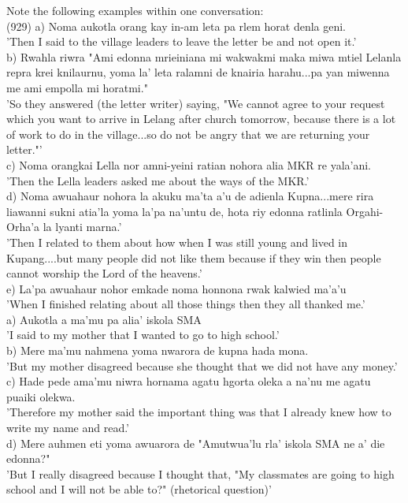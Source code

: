 \documentclass[10pt]{article}
\begin{document}
Note the following examples within one conversation:\\
(929) a) Noma aukotla orang kay in-am leta pa rlem horat denla geni.\\
'Then I said to the village leaders to leave the letter be and not open it.'\\
b) Rwahla riwra "Ami edonna mrieiniana mi wakwakmi maka miwa mtiel Lelanla repra krei knilaurnu, yoma la' leta ralamni de knairia harahu...pa yan miwenna me ami empolla mi horatmi."\\
'So they answered (the letter writer) saying, "We cannot agree to your request which you want to arrive in Lelang after church tomorrow, because there is a lot of work to do in the village...so do not be angry that we are returning your letter."'\\
c) Noma orangkai Lella nor amni-yeini ratian nohora alia MKR re yala'ani.\\
'Then the Lella leaders asked me about the ways of the MKR.'\\
d) Noma awuahaur nohora la akuku ma'ta a'u de adienla Kupna...mere rira liawanni sukni atia'la yoma la'pa na'untu de, hota riy edonna ratlinla Orgahi-Orha'a la lyanti marna.'\\
'Then I related to them about how when I was still young and lived in Kupang....but many people did not like them because if they win then people cannot worship the Lord of the heavens.'\\
e) La'pa awuahaur nohor emkade noma honnona rwak kalwied ma'a'u\\
'When I finished relating about all those things then they all thanked me.'\\
a) Aukotla a ma'mu pa alia' iskola SMA\\
'I said to my mother that I wanted to go to high school.'\\
b) Mere ma'mu nahmena yoma nwarora de kupna hada mona.\\
'But my mother disagreed because she thought that we did not have any money.'\\
c) Hade pede ama'mu niwra hornama agatu hgorta oleka a na'nu me agatu puaiki olekwa.\\
'Therefore my mother said the important thing was that I already knew how to write my name and read.'\\
d) Mere auhmen eti yoma awuarora de "Amutwua'lu rla' iskola SMA ne a' die edonna?"\\
'But I really disagreed because I thought that, "My classmates are going to high school and I will not be able to?" (rhetorical question)'\\
\end{document}
